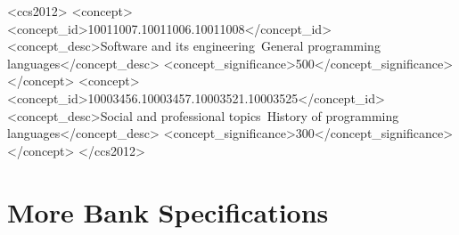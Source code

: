 \documentclass[acmsmall,review,anonymous]{acmart}\settopmatter{printfolios=true,printccs=false,printacmref=false}
\begin{document}
\begin{abstract}
\end{abstract}


\begin{CCSXML}
<ccs2012>
<concept>
<concept_id>10011007.10011006.10011008</concept_id>
<concept_desc>Software and its engineering~General programming languages</concept_desc>
<concept_significance>500</concept_significance>
</concept>
<concept>
<concept_id>10003456.10003457.10003521.10003525</concept_id>
<concept_desc>Social and professional topics~History of programming languages</concept_desc>
<concept_significance>300</concept_significance>
</concept>
</ccs2012>
\end{CCSXML}





\maketitle
 
\section{More Bank Specifications}
 
\end{document}
